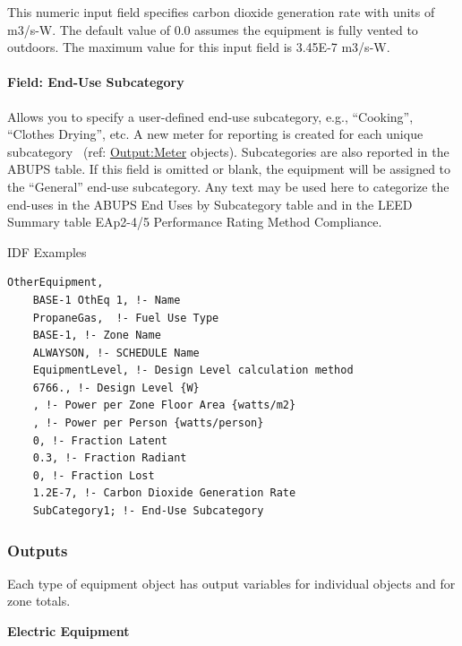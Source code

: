 This numeric input field specifies carbon dioxide generation rate with units of m3/s-W. The default value of 0.0 assumes the equipment is fully vented to outdoors. The maximum value for this input field is 3.45E-7 m3/s-W.

\paragraph{Field: End-Use Subcategory}\label{field-end-use-subcategory-otherequip}

Allows you to specify a user-defined end-use subcategory, e.g., ``Cooking'', ``Clothes Drying'', etc. A new meter for reporting is created for each unique subcategory~ (ref: \hyperref[outputmeter-and-outputmetermeterfileonly]{Output:Meter} objects). Subcategories are also reported in the ABUPS table. If this field is omitted or blank, the equipment will be assigned to the ``General'' end-use subcategory. Any text may be used here to categorize the end-uses in the ABUPS End Uses by Subcategory table and in the LEED Summary table EAp2-4/5 Performance Rating Method Compliance.


IDF Examples

\begin{lstlisting}
OtherEquipment,
	BASE-1 OthEq 1, !- Name
	PropaneGas,  !- Fuel Use Type
	BASE-1, !- Zone Name
	ALWAYSON, !- SCHEDULE Name
	EquipmentLevel, !- Design Level calculation method
	6766., !- Design Level {W}
	, !- Power per Zone Floor Area {watts/m2}
	, !- Power per Person {watts/person}
	0, !- Fraction Latent
	0.3, !- Fraction Radiant
	0, !- Fraction Lost
	1.2E-7, !- Carbon Dioxide Generation Rate
	SubCategory1; !- End-Use Subcategory
\end{lstlisting}

\subsubsection{Outputs}\label{outputs-5-004}

Each type of equipment object has output variables for individual objects and for zone totals.

\textbf{Electric Equipment}

